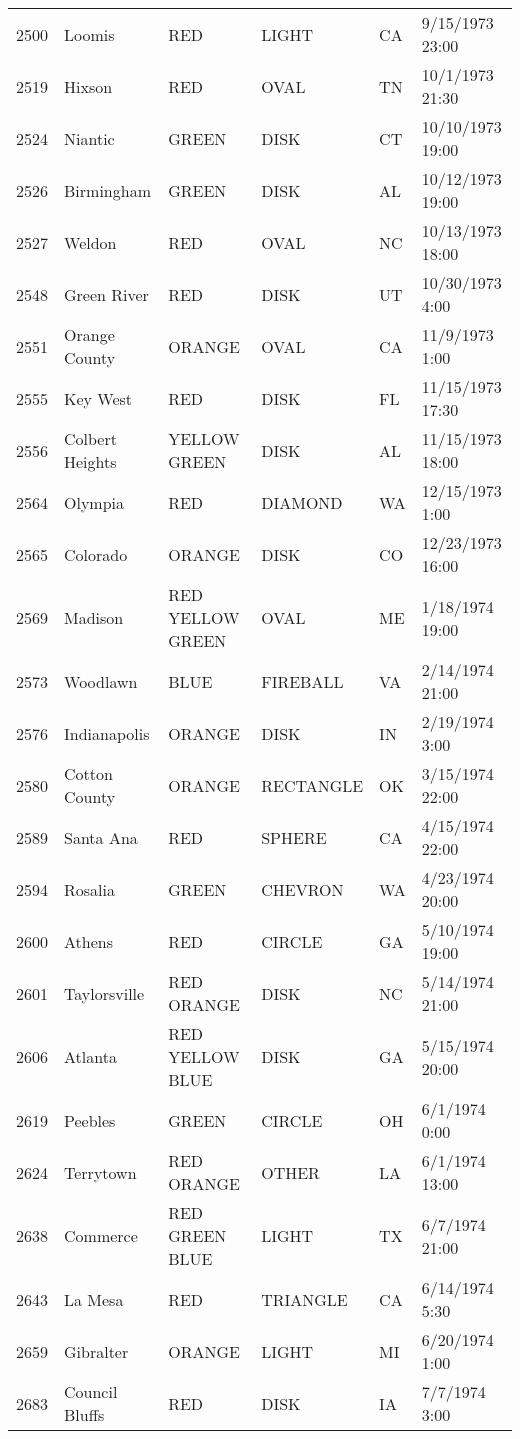 \begin{tabular}{llllll}
2500 & Loomis & RED & LIGHT & CA & 9/15/1973 23:00 \\
2519 & Hixson & RED & OVAL & TN & 10/1/1973 21:30 \\
2524 & Niantic & GREEN & DISK & CT & 10/10/1973 19:00 \\
2526 & Birmingham & GREEN & DISK & AL & 10/12/1973 19:00 \\
2527 & Weldon & RED & OVAL & NC & 10/13/1973 18:00 \\
2548 & Green River & RED & DISK & UT & 10/30/1973 4:00 \\
2551 & Orange County & ORANGE & OVAL & CA & 11/9/1973 1:00 \\
2555 & Key West & RED & DISK & FL & 11/15/1973 17:30 \\
2556 & Colbert Heights & YELLOW GREEN & DISK & AL & 11/15/1973 18:00 \\
2564 & Olympia & RED & DIAMOND & WA & 12/15/1973 1:00 \\
2565 & Colorado & ORANGE & DISK & CO & 12/23/1973 16:00 \\
2569 & Madison & RED YELLOW GREEN & OVAL & ME & 1/18/1974 19:00 \\
2573 & Woodlawn & BLUE & FIREBALL & VA & 2/14/1974 21:00 \\
2576 & Indianapolis & ORANGE & DISK & IN & 2/19/1974 3:00 \\
2580 & Cotton County & ORANGE & RECTANGLE & OK & 3/15/1974 22:00 \\
2589 & Santa Ana & RED & SPHERE & CA & 4/15/1974 22:00 \\
2594 & Rosalia & GREEN & CHEVRON & WA & 4/23/1974 20:00 \\
2600 & Athens & RED & CIRCLE & GA & 5/10/1974 19:00 \\
2601 & Taylorsville & RED ORANGE & DISK & NC & 5/14/1974 21:00 \\
2606 & Atlanta & RED YELLOW BLUE & DISK & GA & 5/15/1974 20:00 \\
2619 & Peebles & GREEN & CIRCLE & OH & 6/1/1974 0:00 \\
2624 & Terrytown & RED ORANGE & OTHER & LA & 6/1/1974 13:00 \\
2638 & Commerce & RED GREEN BLUE & LIGHT & TX & 6/7/1974 21:00 \\
2643 & La Mesa & RED & TRIANGLE & CA & 6/14/1974 5:30 \\
2659 & Gibralter & ORANGE & LIGHT & MI & 6/20/1974 1:00 \\
2683 & Council Bluffs & RED & DISK & IA & 7/7/1974 3:00 \\

\end{tabular}

